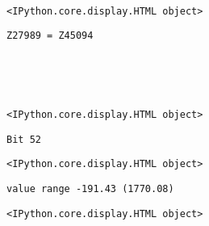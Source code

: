\documentclass[11pt]{article}
\begin{document}
    \begin{center}
    \end{center}
    { \hspace*{\fill} \\}
    
    
    \begin{verbatim}
<IPython.core.display.HTML object>
    \end{verbatim}

    
    \begin{Verbatim}[commandchars=\\\{\}]
Z27989 = Z45094

    \end{Verbatim}

    \begin{center}
    \end{center}
    { \hspace*{\fill} \\}
    
    \begin{center}
    \end{center}
    { \hspace*{\fill} \\}
    
    
    \begin{verbatim}
<IPython.core.display.HTML object>
    \end{verbatim}

    
    \begin{Verbatim}[commandchars=\\\{\}]
Bit 52

    \end{Verbatim}

    
    \begin{verbatim}
<IPython.core.display.HTML object>
    \end{verbatim}

    
    \begin{Verbatim}[commandchars=\\\{\}]
value range -191.43 (1770.08)

    \end{Verbatim}

    
    \begin{verbatim}
<IPython.core.display.HTML object>
    \end{verbatim}
\end{document}
